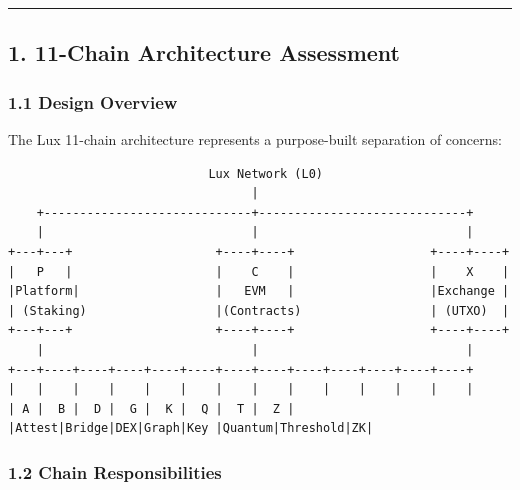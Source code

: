 \documentclass[
]{article}
\begin{document}
\begin{center}\rule{0.5\linewidth}{0.5pt}\end{center}

\subsection{1. 11-Chain Architecture
Assessment}\label{1-11-chain-architecture-assessment}

\subsubsection{1.1 Design Overview}\label{11-design-overview}

The Lux 11-chain architecture represents a purpose-built separation of
concerns:

\begin{verbatim}
                            Lux Network (L0)
                                  |
    +-----------------------------+-----------------------------+
    |                             |                             |
+---+---+                    +----+----+                   +----+----+
|   P   |                    |    C    |                   |    X    |
|Platform|                   |   EVM   |                   |Exchange |
| (Staking)                  |(Contracts)                  | (UTXO)  |
+---+---+                    +----+----+                   +----+----+
    |                             |                             |
+---+----+----+----+----+----+----+----+----+----+----+----+----+
|   |    |    |    |    |    |    |    |    |    |    |    |    |
| A |  B |  D |  G |  K |  Q |  T |  Z |
|Attest|Bridge|DEX|Graph|Key |Quantum|Threshold|ZK|
\end{verbatim}

\subsubsection{1.2 Chain
Responsibilities}\label{12-chain-responsibilities}
\end{document}
